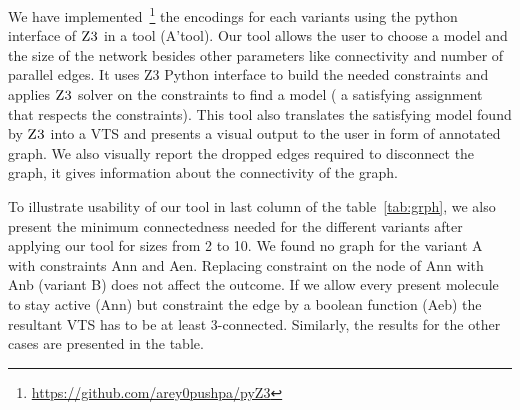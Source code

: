 %

We have implemented~\footnote{\url{https://github.com/arey0pushpa/pyZ3}}
the encodings for each variants
using the python interface of $\textsc{Z3}$ in a tool (A'tool).
%
Our tool allows the user to choose a model and the size of the network
besides other parameters like connectivity and number of parallel
edges.
%
It uses Z3 Python interface to build the needed constraints and
applies $\textsc{Z3}$ solver on the constraints to find a model (
a satisfying assignment that respects the constraints).
%
This tool also translates the satisfying model found by $\textsc{Z3}$ into
a VTS and presents a visual output to the user in form of annotated graph.
%
%
%
We also visually report the dropped edges required to disconnect the graph, it gives information about the connectivity of the graph.


To illustrate usability of our tool 
in last column of the table~\ref{tab:grph}, we also present the minimum connectedness
needed for the different variants after applying our tool for sizes from 2 to 10.
%
We found no graph for the variant A with constraints Ann and Aen.
%
Replacing constraint on the node of Ann with Anb (variant B) does not affect the outcome.
%
If we allow every present molecule to stay active (Ann) but constraint the edge
by a boolean function (Aeb) the resultant VTS has to be at least 3-connected.
%
%
Similarly, the results for the other cases are presented in the table.



